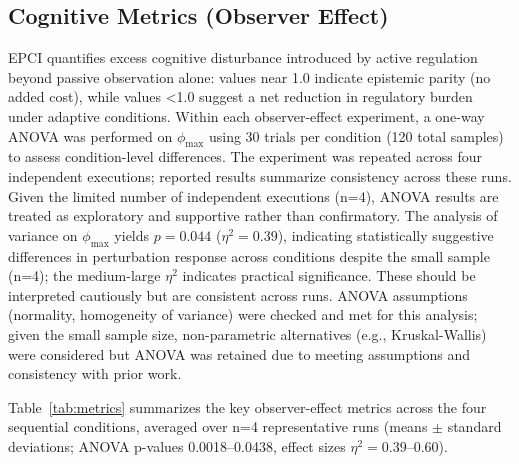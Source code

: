\documentclass[12pt,a4paper]{article}
\begin{document}
\subsection{Cognitive Metrics (Observer Effect)}

EPCI quantifies excess cognitive disturbance introduced by active regulation beyond passive observation alone: values near 1.0 indicate epistemic parity (no added cost), while values <1.0 suggest a net reduction in regulatory burden under adaptive conditions. Within each observer-effect experiment, a one-way ANOVA was performed on $\phi_{\max}$ using 30 trials per condition (120 total samples) to assess condition-level differences. The experiment was repeated across four independent executions; reported results summarize consistency across these runs. Given the limited number of independent executions (n=4), ANOVA results are treated as exploratory and supportive rather than confirmatory. The analysis of variance on $\phi_{\max}$ yields $p = 0.044$ ($\eta^2 = 0.39$), indicating statistically suggestive differences in perturbation response across conditions despite the small sample (n=4); the medium-large $\eta^2$ indicates practical significance. These should be interpreted cautiously but are consistent across runs. ANOVA assumptions (normality, homogeneity of variance) were checked and met for this analysis; given the small sample size, non-parametric alternatives (e.g., Kruskal-Wallis) were considered but ANOVA was retained due to meeting assumptions and consistency with prior work.

Table~\ref{tab:metrics} summarizes the key observer-effect metrics across the four sequential conditions, averaged over n=4 representative runs (means $\pm$ standard deviations; ANOVA p-values 0.0018--0.0438, effect sizes $\eta^2 = 0.39$--0.60).
\end{document}
